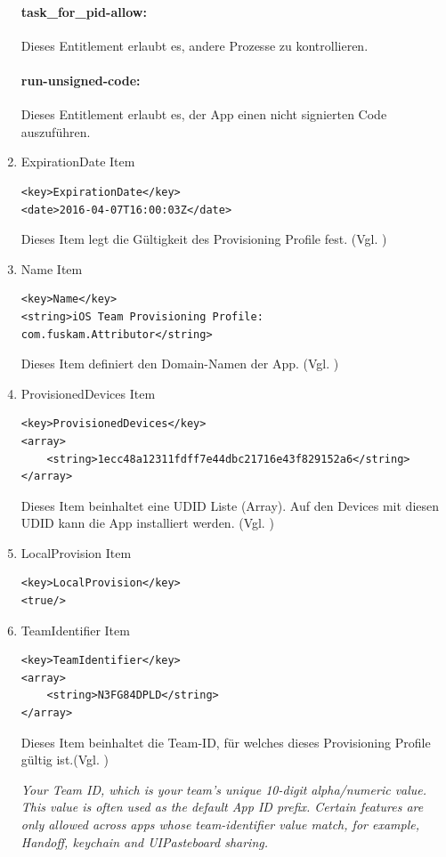 \begin{enumerate}
\paragraph{task\_for\_pid-allow:} Dieses Entitlement erlaubt es, andere Prozesse zu kontrollieren. 

\paragraph{run-unsigned-code:} Dieses Entitlement erlaubt es, der App einen nicht signierten Code auszuführen.

    \item ExpirationDate Item
\begin{lstlisting}[captionpos=b, caption={ExpirationDate Item}]
<key>ExpirationDate</key>
<date>2016-04-07T16:00:03Z</date>
\end{lstlisting}
Dieses Item legt die Gültigkeit des Provisioning Profile fest. (Vgl. \cite{iOSSec[5], Hacking[1]})

    \item Name Item
\begin{lstlisting}[captionpos=b, caption={Name Item}]
<key>Name</key>
<string>iOS Team Provisioning Profile: com.fuskam.Attributor</string>
\end{lstlisting}
Dieses Item definiert den Domain-Namen der App. (Vgl. \cite{iOSSec[5], Hacking[1]})

    \item ProvisionedDevices Item
\begin{lstlisting}[captionpos=b, caption={ProvisionedDevices Item}]
<key>ProvisionedDevices</key>
<array>
    <string>1ecc48a12311fdff7e44dbc21716e43f829152a6</string>
</array>
\end{lstlisting}
Dieses Item beinhaltet eine UDID Liste (Array). Auf den Devices mit diesen UDID kann die App installiert werden. (Vgl. \cite{iOSSec[5], Hacking[1]})

  \item LocalProvision Item
\begin{lstlisting}[captionpos=b, caption={LocalProvision Item}]
<key>LocalProvision</key>
<true/>
\end{lstlisting}

    \item TeamIdentifier Item
\begin{lstlisting}[captionpos=b, caption={TeamIdentifier Item}]
<key>TeamIdentifier</key>
<array>
    <string>N3FG84DPLD</string>
</array>
\end{lstlisting}
Dieses Item beinhaltet die Team-ID, für welches dieses Provisioning Profile gültig ist.(Vgl. \cite{iOSSec[5], Hacking[1]}) \par
\glqq \textit{Your Team ID, which is your team's unique 10-digit alpha/numeric value. This value is often used as the default App ID prefix. Certain features are only allowed across apps whose team-identifier value match, for example, Handoff, keychain and UIPasteboard sharing.}\grqq{} \cite{ProvisioningProfile[3]}


\end{enumerate}
